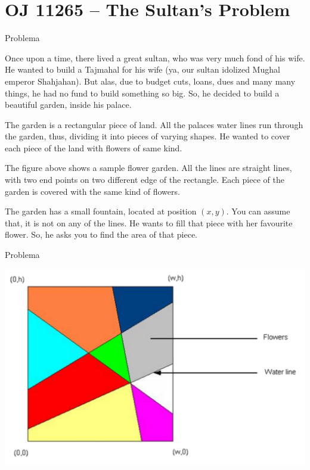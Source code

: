 \section{OJ 11265 -- The Sultan's Problem}

\begin{frame}[fragile]{Problema}

Once upon a time, there lived a great sultan, who was very much fond of his wife. He wanted to build
a Tajmahal for his wife (ya, our sultan idolized Mughal emperor Shahjahan). But alas, due to budget
cuts, loans, dues and many many things, he had no fund to build something so big. So, he decided to
build a beautiful garden, inside his palace.

The garden is a rectangular piece of land. All the palaces water lines run through the garden, thus,
dividing it into pieces of varying shapes. He wanted to cover each piece of the land with flowers of same
kind.

The figure above shows a sample flower garden. All the lines are straight lines, with two end points
on two different edge of the rectangle. Each piece of the garden is covered with the same kind of flowers.

The garden has a small fountain, located at position $(x, y)$. You can assume that, it is not on any
of the lines. He wants to fill that piece with her favourite flower. So, he asks you to find the area of
that piece.

\end{frame}

\begin{frame}[fragile]{Problema}

\begin{center}
\includegraphics[scale=0.7]{figure.png}
\end{center}

\end{frame}


